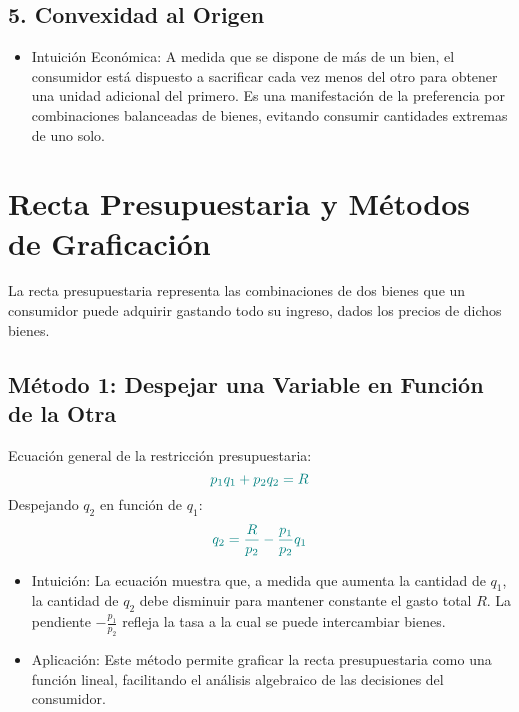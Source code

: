 \documentclass{article}
\begin{document}
\subsection*{5. Convexidad al Origen}
\begin{itemize}
    \item Intuición Económica: A medida que se dispone de más de un bien, el consumidor está dispuesto a sacrificar cada vez menos del otro para obtener una unidad adicional del primero. Es una manifestación de la preferencia por {\color{teal}combinaciones balanceadas de bienes}, evitando consumir cantidades extremas de uno solo.
\end{itemize}

\section*{Recta Presupuestaria y Métodos de Graficación}

La {\color{teal}recta presupuestaria} representa las combinaciones de dos bienes que un consumidor puede adquirir gastando todo su ingreso, dados los precios de dichos bienes.

\subsection*{Método 1: Despejar una Variable en Función de la Otra}
Ecuación general de la restricción presupuestaria:
\begin{equation*}
{\color{teal}p_1 q_1 + p_2 q_2 = R}
\end{equation*}
Despejando \( q_2 \) en función de \( q_1 \):
\begin{equation*}
{\color{teal}q_2 = \frac{R}{p_2} - \frac{p_1}{p_2} q_1}
\end{equation*}
\begin{itemize}
    \item Intuición: La ecuación muestra que, a medida que aumenta la cantidad de \( q_1 \), la cantidad de \( q_2 \) debe disminuir para mantener constante el gasto total \( R \). La {\color{teal}pendiente} \( -\frac{p_1}{p_2} \) refleja la {\color{teal}tasa a la cual se puede intercambiar bienes}.
    \item Aplicación: Este método permite graficar la recta presupuestaria como una función lineal, facilitando el {\color{teal}análisis algebraico} de las decisiones del consumidor.
\end{itemize}
\end{document}
